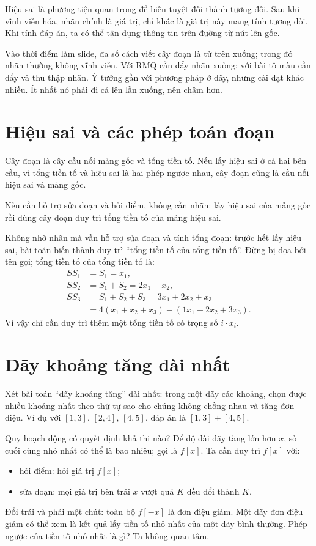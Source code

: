 \documentclass[11pt]{article}
\begin{document}
Hiệu sai là phương tiện quan trọng để biến tuyệt đối thành tương đối.  Sau khi
vĩnh viễn hóa, nhãn chính là giá trị, chỉ khác là giá trị này mang tính tương
đối.  Khi tính đáp án, ta có thể tận dụng thông tin trên đường từ nút lên gốc.

Vào thời điểm làm slide, đa số cách viết cây đoạn là từ trên xuống; trong đó
nhãn thường không vĩnh viễn.  Với RMQ cần đẩy nhãn xuống; với bài tô màu cần
đẩy và thu thập nhãn.  Ý tưởng gần với phương pháp ở đây, nhưng cài đặt khác
nhiều.  Ít nhất nó phải đi cả lên lẫn xuống, nên chậm hơn.

\section{Hiệu sai và các phép toán đoạn}

Cây đoạn là cây cầu nối mảng gốc và tổng tiền tố.  Nếu lấy hiệu sai ở cả hai
bên cầu, vì tổng tiền tố và hiệu sai là hai phép ngược nhau, cây đoạn cũng là
cầu nối hiệu sai và mảng gốc.

Nếu cần hỗ trợ sửa đoạn và hỏi điểm, không cần nhãn: lấy hiệu sai của mảng gốc
rồi dùng cây đoạn duy trì tổng tiền tố của mảng hiệu sai.

Không nhờ nhãn mà vẫn hỗ trợ sửa đoạn và tính tổng đoạn: trước hết lấy hiệu
sai, bài toán biến thành duy trì ``tổng tiền tố của tổng tiền tố''.  Đừng bị
dọa bởi tên gọi; tổng tiền tố của tổng tiền tố là:
\[
\begin{aligned}
SS_1 &= S_1 = x_1,\\
SS_2 &= S_1+S_2 = 2x_1+x_2,\\
SS_3 &= S_1+S_2+S_3 = 3x_1+2x_2+x_3\\
     &= 4(x_1+x_2+x_3)-(1x_1+2x_2+3x_3).
\end{aligned}
\]
Vì vậy chỉ cần duy trì thêm một tổng tiền tố có trọng số $i\cdot x_i$.

\section{Dãy khoảng tăng dài nhất}

Xét bài toán ``dãy khoảng tăng'' dài nhất: trong một dãy các khoảng, chọn được
nhiều khoảng nhất theo thứ tự sao cho chúng không chồng nhau và tăng đơn điệu.
Ví dụ với $[1,3]$, $[2,4]$, $[4,5]$, đáp án là $[1,3]+[4,5]$.

Quy hoạch động có quyết định khả thi nào?  Để độ dài dãy tăng lớn hơn $x$, số
cuối cùng nhỏ nhất có thể là bao nhiêu; gọi là $f[x]$.  Ta cần duy trì $f[x]$
với:
\begin{itemize}
  \item hỏi điểm: hỏi giá trị $f[x]$;
  \item sửa đoạn: mọi giá trị bên trái $x$ vượt quá $K$ đều đổi thành $K$.
\end{itemize}
Đổi trái và phải một chút: toàn bộ $f[-x]$ là đơn điệu giảm.  Một dãy đơn điệu
giảm có thể xem là kết quả lấy tiền tố nhỏ nhất của một dãy bình thường.  Phép
ngược của tiền tố nhỏ nhất là gì?  Ta không quan tâm.
\end{document}

